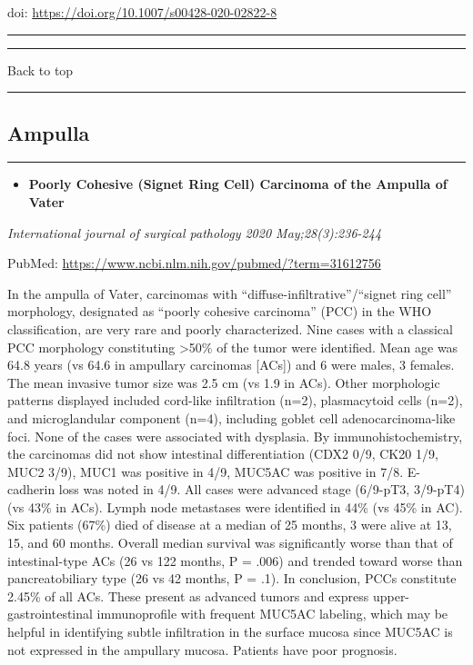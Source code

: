 \documentclass[
]{article}
\providecommand{\tightlist}{%
  \setlength{\itemsep}{0pt}\setlength{\parskip}{0pt}}
\begin{document}
doi: \url{https://doi.org/10.1007/s00428-020-02822-8}

\begin{center}\rule{0.5\linewidth}{0.5pt}\end{center}

\begin{center}\rule{0.5\linewidth}{0.5pt}\end{center}

Back to top

\begin{center}\rule{0.5\linewidth}{0.5pt}\end{center}

\pagebreak

\hypertarget{ampulla}{%
\subsection{Ampulla}\label{ampulla}}

\begin{center}\rule{0.5\linewidth}{0.5pt}\end{center}

\begin{itemize}
\tightlist
\item
  \textbf{Poorly Cohesive (Signet Ring Cell) Carcinoma of the Ampulla of
  Vater}
\end{itemize}

\emph{International journal of surgical pathology 2020
May;28(3):236-244}

PubMed: \url{https://www.ncbi.nlm.nih.gov/pubmed/?term=31612756}

In the ampulla of Vater, carcinomas with
``diffuse-infiltrative''/``signet ring cell'' morphology, designated as
``poorly cohesive carcinoma'' (PCC) in the WHO classification, are very
rare and poorly characterized. Nine cases with a classical PCC
morphology constituting \textgreater50\% of the tumor were identified.
Mean age was 64.8 years (vs 64.6 in ampullary carcinomas {[}ACs{]}) and
6 were males, 3 females. The mean invasive tumor size was 2.5 cm (vs 1.9
in ACs). Other morphologic patterns displayed included cord-like
infiltration (n=2), plasmacytoid cells (n=2), and microglandular
component (n=4), including goblet cell adenocarcinoma-like foci. None of
the cases were associated with dysplasia. By immunohistochemistry, the
carcinomas did not show intestinal differentiation (CDX2 0/9, CK20 1/9,
MUC2 3/9), MUC1 was positive in 4/9, MUC5AC was positive in 7/8.
E-cadherin loss was noted in 4/9. All cases were advanced stage
(6/9-pT3, 3/9-pT4) (vs 43\% in ACs). Lymph node metastases were
identified in 44\% (vs 45\% in AC). Six patients (67\%) died of disease
at a median of 25 months, 3 were alive at 13, 15, and 60 months. Overall
median survival was significantly worse than that of intestinal-type ACs
(26 vs 122 months, P = .006) and trended toward worse than
pancreatobiliary type (26 vs 42 months, P = .1). In conclusion, PCCs
constitute 2.45\% of all ACs. These present as advanced tumors and
express upper-gastrointestinal immunoprofile with frequent MUC5AC
labeling, which may be helpful in identifying subtle infiltration in the
surface mucosa since MUC5AC is not expressed in the ampullary mucosa.
Patients have poor prognosis.
\end{document}
